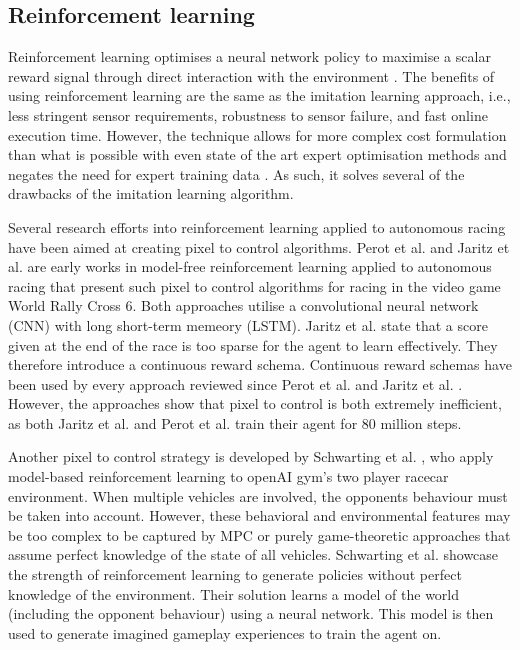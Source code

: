 \subsection{Reinforcement learning}
\label{sec:reinforcement_learning}

Reinforcement learning optimises a neural network policy to maximise a scalar reward signal through direct interaction with the environment \cite{Plaat_2022}. 
The benefits of using reinforcement learning are the same as the imitation learning approach, i.e., less stringent sensor requirements, robustness to sensor failure, and fast online execution time. However, the technique allows for more complex cost formulation than what is possible with even state of the art expert optimisation methods and negates the need for expert training data \cite{Fuchs2021}.
As such, it solves several of the drawbacks of the imitation learning algorithm.


Several research efforts into reinforcement learning applied to autonomous racing have been aimed at creating pixel to control algorithms. 
Perot et al. \cite{Perot2017} and Jaritz et al. \cite{Jaritz2018} are early works in model-free reinforcement learning applied to autonomous racing that present such pixel to control algorithms for racing in the video game World Rally Cross 6.
Both approaches utilise a convolutional neural network (CNN) with long short-term memeory (LSTM). 
Jaritz et al. \cite{Jaritz2018} state that a score given at the end of the race is too sparse for the agent to learn effectively.
They therefore introduce a continuous reward schema.
Continuous reward schemas have been used by every approach reviewed since Perot et al. \cite{Perot2017} and Jaritz et al. \cite{Jaritz2018}.
However, the approaches show that pixel to control is both extremely inefficient, as both Jaritz et al. \cite{Jaritz2018} and Perot et al. \cite{Perot2017} train their agent for 80 million steps.



Another pixel to control strategy is developed by Schwarting et al. \cite{Schwarting2021}, who apply model-based reinforcement learning to openAI gym's two player racecar environment.
When multiple vehicles are involved, the opponents behaviour must be taken into account.
However, these behavioral and environmental features may be too complex to be captured by MPC or purely game-theoretic approaches that assume perfect knowledge of the state of all vehicles.
Schwarting et al. \cite{Schwarting2021} showcase the strength of reinforcement learning to generate policies without perfect knowledge of the environment.
Their solution learns a model of the world (including the opponent behaviour) using a neural network.
This model is then used to generate imagined gameplay experiences to train the agent on.


